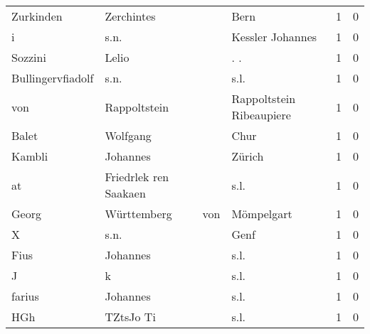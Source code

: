 \begin{center}
\begin{tiny}
\begin{longtabu}{llllrr}
                Zurkinden &                         Zerchintes &             &                                        Bern &          1 &         0 \\
                        i &                               s.n. &             &                            Kessler Johannes &          1 &         0 \\
                  Sozzini &                              Lelio &             &                                        . .  &          1 &         0 \\
        Bullingervfiadolf &                               s.n. &             &                                        s.l. &          1 &         0 \\
                      von &                       Rappoltstein &             &                    Rappoltstein Ribeaupiere &          1 &         0 \\
                    Balet &                           Wolfgang &             &                                        Chur &          1 &         0 \\
                   Kambli &                           Johannes &             &                                      Zürich &          1 &         0 \\
                       at &              Friedrlek ren Saakaen &             &                                        s.l. &          1 &         0 \\
                    Georg &                        Württemberg &         von &                                  Mömpelgart &          1 &         0 \\
                        X &                               s.n. &             &                                        Genf &          1 &         0 \\
                     Fius &                           Johannes &             &                                        s.l. &          1 &         0 \\
                        J &                                  k &             &                                        s.l. &          1 &         0 \\
                   farius &                           Johannes &             &                                        s.l. &          1 &         0 \\
                      HGh &                          TZtsJo Ti &             &                                        s.l. &          1 &         0 \\

\end{longtabu}
\end{tiny}
\end{center}
